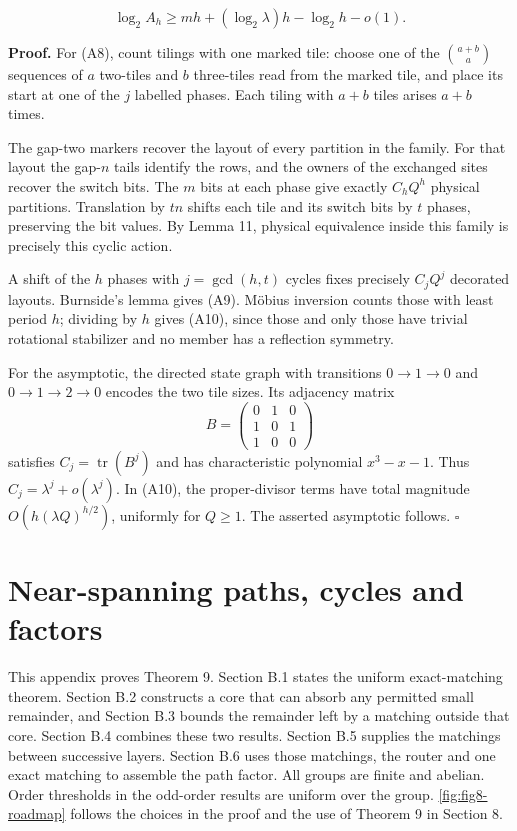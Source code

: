 \documentclass[11pt,a4paper]{article}
\newcommand{\labelledparagraphstart}{\par\addvspace{3pt plus 1pt minus 1pt}\noindent}
\begin{document}
\[
 \log_2 A_h\geq mh+(\log_2\lambda)h-\log_2 h-o(1).
\]

\labelledparagraphstart\textbf{Proof.} For (A8), count tilings with one marked tile: choose one of the \(\binom{a+b}{a}\) sequences of \(a\) two-tiles and \(b\) three-tiles read from the marked tile, and place its start at one of the \(j\) labelled phases. Each tiling with \(a+b\) tiles arises \(a+b\) times.

The gap-two markers recover the layout of every partition in the family. For that layout the gap-\(n\) tails identify the rows, and the owners of the exchanged sites recover the switch bits. The \(m\) bits at each phase give exactly \(C_hQ^h\) physical partitions. Translation by \(tn\) shifts each tile and its switch bits by \(t\) phases, preserving the bit values. By Lemma 11, physical equivalence inside this family is precisely this cyclic action.

A shift of the \(h\) phases with \(j=\gcd(h,t)\) cycles fixes precisely \(C_jQ^j\) decorated layouts. Burnside's lemma gives (A9). Möbius inversion counts those with least period \(h\); dividing by \(h\) gives (A10), since those and only those have trivial rotational stabilizer and no member has a reflection symmetry.

For the asymptotic, the directed state graph with transitions \(0\to1\to0\) and \(0\to1\to2\to0\) encodes the two tile sizes. Its adjacency matrix \[
 B=\begin{pmatrix}0&1&0\\1&0&1\\1&0&0\end{pmatrix}
\] satisfies \(C_j=\operatorname{tr}(B^j)\) and has characteristic polynomial \(x^3-x-1\). Thus \(C_j=\lambda^j+o(\lambda^j)\). In (A10), the proper-divisor terms have total magnitude \(O(h(\lambda Q)^{h/2})\), uniformly for \(Q\geq1\). The asserted asymptotic follows. \(\square\)

\hypertarget{near-spanning-paths-cycles-and-factors}{%
\section{Near-spanning paths, cycles and factors}\label{near-spanning-paths-cycles-and-factors}}

This appendix proves Theorem 9. Section B.1 states the uniform exact-matching theorem. Section B.2 constructs a core that can absorb any permitted small remainder, and Section B.3 bounds the remainder left by a matching outside that core. Section B.4 combines these two results. Section B.5 supplies the matchings between successive layers. Section B.6 uses those matchings, the router and one exact matching to assemble the path factor. All groups are finite and abelian. Order thresholds in the odd-order results are uniform over the group. \autoref{fig:fig8-roadmap} follows the choices in the proof and the use of Theorem 9 in Section 8.
\end{document}
